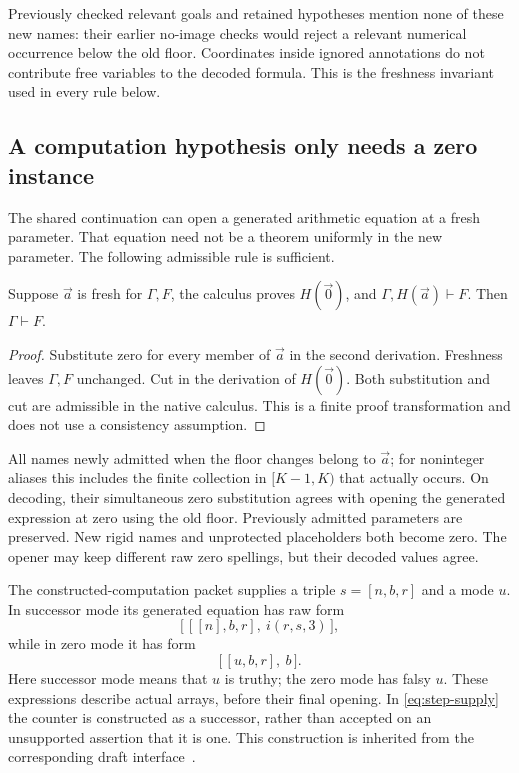 Previously checked relevant goals and retained hypotheses mention none
of these new names: their earlier no-image checks would reject a
relevant numerical occurrence below the old floor.  Coordinates inside
ignored annotations do not contribute free variables to the decoded
formula.  This is the freshness invariant used in every rule below.

\subsection{A computation hypothesis only needs a zero instance}
\label{subsec:zero-supply}

The shared continuation can open a generated arithmetic equation at a
fresh parameter.  That equation need not be a theorem uniformly in the
new parameter.  The following admissible rule is sufficient.

\begin{lemma}
\label{lem:zero-supply}
Suppose $\vec a$ is fresh for $\Gamma,F$, the calculus proves
$H(\vec0)$, and $\Gamma,H(\vec a)\vdash F$.  Then
$\Gamma\vdash F$.
\end{lemma}

\begin{proof}
Substitute zero for every member of $\vec a$ in the second derivation.
Freshness leaves $\Gamma,F$ unchanged.  Cut in the derivation of
$H(\vec0)$.  Both substitution and cut are admissible in the native
calculus.  This is a finite proof transformation and does not use a
consistency assumption.
\end{proof}

All names newly admitted when the floor changes belong to $\vec a$;
for noninteger aliases this includes the finite collection in
$[K-1,K)$ that actually occurs.  On decoding, their simultaneous zero
substitution agrees with opening the generated expression at zero using
the old floor.  Previously admitted parameters are preserved.  New
rigid names and unprotected placeholders both become zero.  The opener
may keep different raw zero spellings, but their decoded values agree.

The constructed-computation packet supplies a triple $s=[n,b,r]$ and a
mode $u$.  In successor mode its generated equation has raw form
\[
 \bigl[\,[[n],b,r],\ i(r,s,3)\,\bigr],
 \tag{Step supply}\label{eq:step-supply}
\]
while in zero mode it has form
\[
                    \bigl[\,[u,b,r],\ b\,\bigr].
 \tag{Zero supply}\label{eq:base-supply}
\]
Here successor mode means that $u$ is truthy; the zero mode has falsy
$u$.  These expressions describe actual arrays, before their final
opening.  In \eqref{eq:step-supply} the counter is constructed as a
successor, rather than accepted on an unsupported assertion that it is
one.  This construction is inherited from the corresponding draft
interface~\cite{constructed}.


